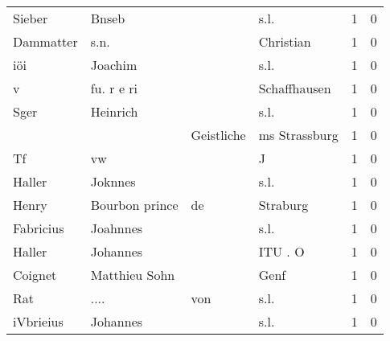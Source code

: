 \begin{tabular}{llllrr}
                   Sieber &                              Bnseb &             &                                        s.l. &          1 &         0 \\
                Dammatter &                               s.n. &             &                                   Christian &          1 &         0 \\
                      iöi &                            Joachim &             &                                        s.l. &          1 &         0 \\
                        v &                         fu. r e ri &             &                                Schaffhausen &          1 &         0 \\
                     Sger &                           Heinrich &             &                                        s.l. &          1 &         0 \\
                          &                                    &  Geistliche &                               ms Strassburg &          1 &         0 \\
                       Tf &                                 vw &             &                                           J &          1 &         0 \\
                   Haller &                            Joknnes &             &                                        s.l. &          1 &         0 \\
                    Henry &                     Bourbon prince &          de &                                    Straburg &          1 &         0 \\
                Fabricius &                           Joahnnes &             &                                        s.l. &          1 &         0 \\
                   Haller &                           Johannes &             &                                     ITU . O &          1 &         0 \\
                  Coignet &                      Matthieu Sohn &             &                                        Genf &          1 &         0 \\
                      Rat &                               .... &         von &                                        s.l. &          1 &         0 \\
                iVbrieius &                           Johannes &             &                                        s.l. &          1 &         0 \\

\end{tabular}
